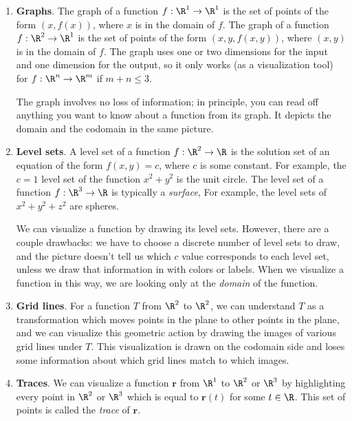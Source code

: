 \documentclass{watsonbook}
\begin{document}
\begin{tcolorbox}[title = Function Visualization Methods, colback =
  softblue, colframe = MidnightBlue] 
  \begin{enumerate}[leftmargin = 12pt, itemsep = 6pt, parsep = 6pt]
  \item \textbf{Graphs}. The graph of a function $f : \R^1 \to \R^1$ is
    the set of points of the form $(x,f(x))$, where $x$ is in the
    domain of $f$. The graph of a function $f : \R^2 \to \R^1$ is
    the set of points of the form $(x,y,f(x,y))$, where $(x,y)$ is in the
    domain of $f$. The graph uses one or two dimensions for the input
    and one dimension for the output, so it only works (as a
    visualization tool) for $f : \R^n \to \R^m$ if $m + n \leq 3$.

    The graph involves no loss of information; in principle, you can
    read off anything you want to know about a function from its
    graph. It depicts the domain and the codomain in the same picture. 
    
  \item \textbf{Level sets}. A level set of a function $f:\R^2 \to \R$
    is the solution set of an equation of the form $f(x,y) = c$, where
    $c$ is some constant. For example, the $c=1$ level set of the
    function $x^2 + y^2$ is the unit circle. The level set of a
    function $f:\R^3 \to \R$ is typically a \textit{surface}, For
    example, the level sets of $x^2 + y^2 + z^2$ are spheres.

    We can visualize a function by drawing its level sets. However,
    there are a couple drawbacks: we have to choose a discrete number
    of level sets to draw, and the picture doesn't tell us which $c$
    value corresponds to each level set, unless we draw that
    information in with colors or labels. When we visualize a function
    in this way, we are looking only at the \textit{domain} of the
    function. 

  \item \textbf{Grid lines}. For a function $T$ from $\R^2$ to $\R^2$, we can
    understand $T$ as a transformation which moves points in the plane
    to other points in the plane, and we can visualize this geometric
    action by drawing the images of various grid lines under $T$. This
    visualization is drawn on the codomain side and loses some
    information about which grid lines match to which images. 
    
  \item \textbf{Traces}. We can visualize a function $\mathbf{r}$ from
    $\R^1$ to $\R^2$ or $\R^3$ by highlighting every point in $\R^2$
    or $\R^3$ which is equal to $\mathbf{r}(t)$ for some $t\in
    \R$. This set of points is called the \textit{trace} of
    $\mathbf{r}$.


\end{enumerate}
\end{tcolorbox}
\end{document}
